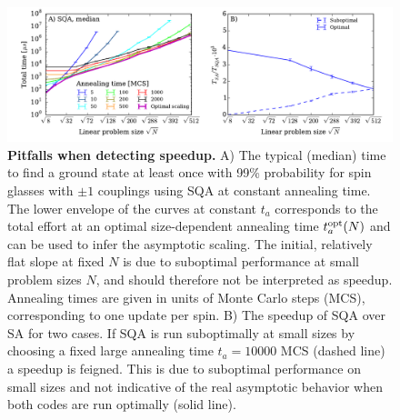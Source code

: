 \begin{figure}
\includegraphics[width=\columnwidth]{chapters/Speedup/fig01.pdf}
\caption{{\bf Pitfalls when detecting speedup.} A) The typical (median)  time to find a ground state at least once with 99\%  probability for spin glasses with $\pm1$ couplings using SQA at constant annealing time. The lower envelope of the curves at constant $t_a$ corresponds to the total effort at an optimal size-dependent annealing time $t_a^{\rm opt}(N)$ and can be used to infer the asymptotic scaling. The initial, relatively flat slope at fixed $N$ is due to suboptimal performance at small problem sizes $N$, and should therefore not be interpreted as speedup. Annealing times are given in units of Monte Carlo steps (MCS), corresponding to one update per spin. B) The speedup of SQA over SA for two cases. If SQA is run suboptimally at small sizes by choosing a fixed large annealing time $t_a=10000$ MCS (dashed line) a speedup is feigned. This is due to suboptimal performance on small sizes and not indicative of the real asymptotic behavior when both codes are run optimally (solid line).}
\label{fig:medianfixed}
\end{figure}
